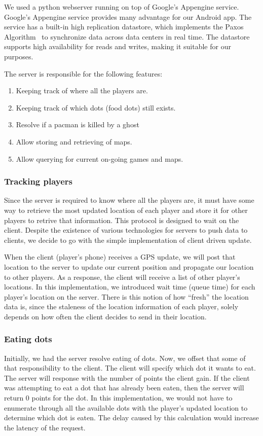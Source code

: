 \documentclass{acm_proc_article-sp}
\begin{document}
We used a python webserver running on top of Google's Appengine
service. Google's Appengine service provides many advantage for our
Android app. The service has a built-in high replication datastore,
which implements the Paxos Algorithm~\cite{lamport01paxos} to
synchronize data across data centers in real time. The datastore
supports high availability for reads and writes, making it suitable
for our purposes.

The server is responsible for the following features:

\begin{enumerate}
\item Keeping track of where all the players are.
\item Keeping track of which dots (food dots) still exists.
\item Resolve if a pacman is killed by a ghost
\item Allow storing and retrieving of maps.
\item Allow querying for current on-going games and maps.
\end{enumerate}

\subsubsection{Tracking players}
Since the server is required to know where all the players are, it
must have some way to retrieve the most updated location of each
player and store it for other players to retrive that
information. This protocol is designed to wait on the client. Despite
the existence of various technologies for servers to push data to
clients, we decide to go with the simple implementation of client
driven update.

When the client (player's phone) receives a GPS update, we will post
that location to the server to update our current position and
propagate our location to other players. As a response, the client
will receive a list of other player's locations. In this
implementation, we introduced wait time (queue time) for each
player's location on the server. There is this notion of how ``fresh''
the location data is, since the staleness of the location information
of each player, solely depends on how often the client decides to send
in their location. 

\subsubsection{Eating dots}
Initially, we had the server resolve eating of dots. Now, we offset
that some of that responsibility to the client. The client will
specify which dot it wants to eat. The server will response with the
number of points the client gain. If the client was attempting to eat
a dot that has already been eaten, then the server will return 0
points for the dot. In this implementation, we would not have to
enumerate through all the available dots with the player's updated
location to determine which dot is eaten. The delay caused by this
calculation would increase the latency of the request.
\end{document}
